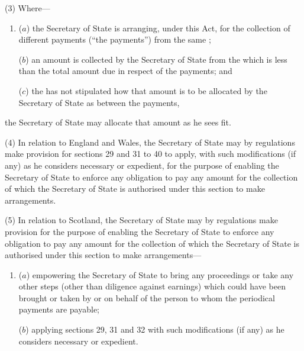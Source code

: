 \documentclass[12pt,a4paper]{article}
\begin{document}
(3) Where---
\begin{enumerate}\item[]
($a$) the Secretary of State is arranging, under this Act, for the collection of different payments (“the payments”) from the same ;

($b$) an amount is collected by the Secretary of State from the  which is less than the total amount due in respect of the payments; and

($c$) the  has not stipulated how that amount
is to be allocated by the Secretary of State as between the payments, 
\end{enumerate}
the Secretary of State may allocate that amount as he sees fit.

(4)
In relation to England and Wales, the Secretary of State may by regulations make provision for sections 29 and 31 to 40 to apply, with such modifications (if any) as he considers necessary or expedient, for the purpose of enabling the Secretary of State to enforce any obligation to pay any amount for the collection of which the Secretary of State is authorised under this section to make arrangements.

(5)
In relation to Scotland, the Secretary of State may by regulations make provision for the purpose of enabling the Secretary of State to enforce any obligation to pay any amount for the collection of which the Secretary of State is authorised under this section to make arrangements---
\begin{enumerate}\item[]
($a$) empowering the Secretary of State to bring any proceedings or take any other steps (other than diligence against earnings) which could have been brought or taken by or on behalf of the person to whom the periodical payments are payable;

($b$) applying sections 29, 31 and 32 with such modifications (if any) as he considers necessary or expedient.
\end{enumerate}

\end{document}
